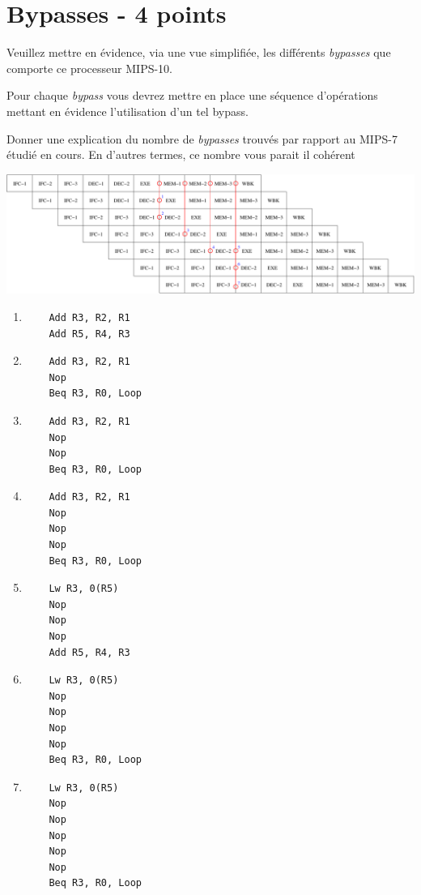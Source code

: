 {%
%

\section{Bypasses - 4 points}

Veuillez mettre en \'evidence, via une vue simplifi\'ee, les diff\'erents
\textit{bypasses} que comporte ce processeur MIPS-10.

Pour chaque \textit{bypass} vous devrez mettre en place une s\'equence
d'op\'erations mettant en \'evidence l'utilisation d'un tel bypass.

Donner une explication du nombre de \textit{bypasses} trouv\'es par rapport
au MIPS-7 \'etudi\'e en cours. En d'autres termes, ce nombre vous parait
il coh\'erent

\begin{correction}

  \begin{center}
    \includegraphics[scale=0.45]{figures/correction-bypasses.pdf}
  \end{center}

  \begin{enumerate}
    \item
      \begin{verbatim}
	Add R3, R2, R1
	Add R5, R4, R3
      \end{verbatim}
    \item
      \begin{verbatim}
	Add R3, R2, R1
	Nop
	Beq R3, R0, Loop
      \end{verbatim}
    \item
      \begin{verbatim}
	Add R3, R2, R1
	Nop
	Nop
	Beq R3, R0, Loop
      \end{verbatim}
    \item
      \begin{verbatim}
	Add R3, R2, R1
	Nop
	Nop
	Nop
	Beq R3, R0, Loop
      \end{verbatim}
    \item
      \begin{verbatim}
	Lw R3, 0(R5)
	Nop
	Nop
	Nop
	Add R5, R4, R3
      \end{verbatim}
    \item
      \begin{verbatim}
	Lw R3, 0(R5)
	Nop
	Nop
	Nop
	Nop
	Beq R3, R0, Loop
      \end{verbatim}
    \item
      \begin{verbatim}
	Lw R3, 0(R5)
	Nop
	Nop
	Nop
	Nop
	Nop
	Beq R3, R0, Loop
      \end{verbatim}
  \end{enumerate}


\end{correction}}

